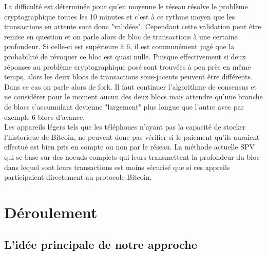\documentclass[12pt,a4paper]{article}
\begin{document}
	La difficulté est déterminée pour qu'en moyenne le réseau résolve le problème cryptographique toutes les 10 minutes et c'est à ce rythme moyen que les transactions en attente sont donc "validées". Cependant cette validation peut être remise en question et on parle alors de bloc de transactions à une certaine profondeur. Si celle-ci est supérieure à 6, il est communément jugé que la probabilité de révoquer ce bloc est quasi nulle. Puisque effectivement si deux réponses au problème cryptographique posé sont trouvées à peu près en même temps, alors les deux blocs de transactions sous-jacents peuvent être différents. Dans ce cas on parle alors de fork. Il faut continuer l'algorithme de consensus et ne considérer pour le moment aucun des deux blocs mais attendre qu'une branche de blocs s'accumulant devienne "largement" plus longue que l'autre avec par exemple 6 blocs d'avance.\\ %
	Les appareils légers tels que les téléphones n'ayant pas la capacité de stocker l'historique de Bitcoin, ne peuvent donc pas vérifier si le paiement qu'ils auraient effectué est bien pris en compte ou non par le réseau. La méthode actuelle SPV qui se base sur des noeuds complets qui leurs transmettent la profondeur du bloc dans lequel sont leurs transactions est moins sécurisé que si ces appreils participaient directement au protocole Bitcoin. %
		
	\section{Déroulement} %
	
	\subsection{L'idée principale de notre approche} %
	
\end{document}
